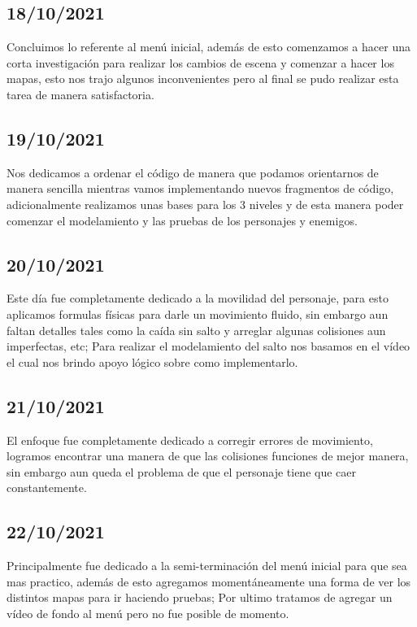 \documentclass{article}
\begin{document}
    \subsection{18/10/2021}
    Concluimos lo referente al menú inicial, además de esto comenzamos a hacer una corta investigación para realizar los cambios de escena y comenzar a hacer los mapas, esto nos trajo algunos inconvenientes pero al final se pudo realizar esta tarea de manera satisfactoria.
    
    \subsection{19/10/2021}
    Nos dedicamos a ordenar el código de manera que podamos orientarnos de manera sencilla mientras vamos implementando nuevos fragmentos de código, adicionalmente realizamos unas bases para los 3 niveles y de esta manera poder comenzar el modelamiento y las pruebas de los personajes y enemigos.
    
    \subsection{20/10/2021}
    Este día fue completamente dedicado a la movilidad del personaje, para esto aplicamos formulas físicas para darle un movimiento fluido, sin embargo aun faltan detalles tales como la caída sin salto y arreglar algunas colisiones aun imperfectas, etc; Para realizar el modelamiento del salto nos basamos en el vídeo \cite{video_jump} el cual nos brindo apoyo lógico sobre como implementarlo.
    
    \subsection{21/10/2021}
    El enfoque fue completamente dedicado a corregir errores de movimiento, logramos encontrar una manera de que las colisiones funciones de mejor manera, sin embargo aun queda el problema de que el personaje tiene que caer constantemente.
    
    \subsection{22/10/2021}
    Principalmente fue dedicado a la semi-terminación del menú inicial para que sea mas practico, además de esto agregamos momentáneamente una forma de ver los distintos mapas para ir haciendo pruebas; Por ultimo tratamos de agregar un vídeo de fondo al menú pero no fue posible de momento.
    
\end{document}
